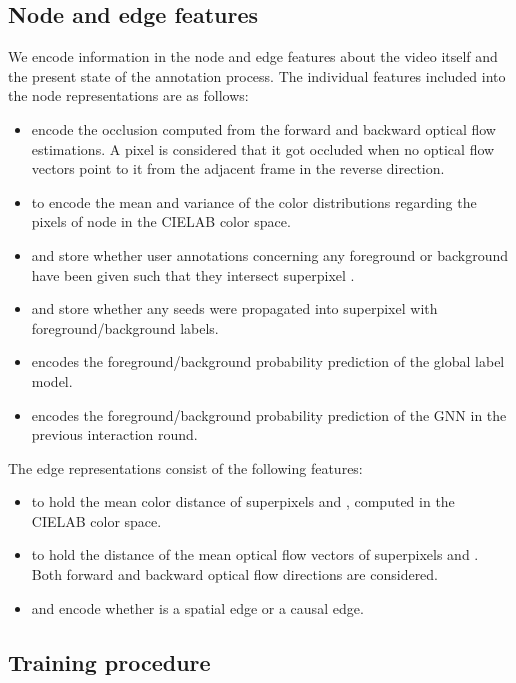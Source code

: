 \documentclass[conference]{IEEEtran}
\begin{document}
\subsection{Node and edge features} \label{subsection:method_features}

We encode information in the node and edge features about the video itself and the present state of the annotation process. The individual features included into the  node representations  are as follows:

\begin{itemize}
    \item  encode the occlusion computed from the forward and backward optical flow estimations. A pixel is considered that it got occluded when no optical flow vectors point to it from the adjacent frame in the reverse direction.
    \item  to  encode the mean and variance of the color distributions regarding the pixels of node  in the CIELAB color space.
    \item  and  store whether user annotations concerning any foreground or background have been given such that they intersect superpixel .
    \item  and  store whether any seeds were propagated into superpixel  with foreground/background labels.
    \item  encodes the foreground/background probability prediction of the global label model.
    \item  encodes the foreground/background probability prediction of the GNN in the previous interaction round.
\end{itemize}

The  edge representations consist of the following features:

\begin{itemize}
    \item  to  hold the mean  color distance of superpixels  and , computed in the CIELAB color space.
    \item  to  hold the  distance of the mean optical flow vectors of superpixels  and . Both forward and backward optical flow directions are considered.
    \item  and  encode whether  is a spatial edge or a causal edge.
\end{itemize}


\subsection{Training procedure} \label{subsection:method_training}
\end{document}
